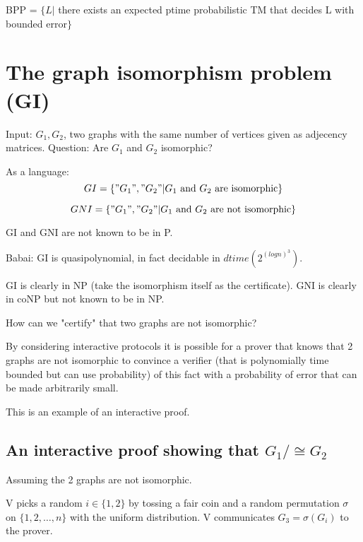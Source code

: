 \documentclass[a4paper,12pt]{article}
\theoremstyle{definition}
\theoremstyle{remark}
\begin{document}
BPP = $\{L | $ there exists an expected ptime probabilistic TM that decides L with bounded error$\}$







\newpage

\section{The graph isomorphism problem (GI)}

Input: $G_1, G_2$, two graphs with the same number of vertices given as adjecency matrices.
Question: Are $G_1$ and $G_2$ isomorphic?

As a language:
\begin{equation*}
    GI = \{"G_1", "G_2" | G_1 \text{ and } G_2 \text{ are isomorphic}\}
\end{equation*}

\begin{equation*}
    GNI = \{"G_1", "G_2" | G_1 \text{ and } G_2 \text{ are not isomorphic}\}
\end{equation*}

GI and GNI are not known to be in P.

Babai: GI is quasipolynomial, in fact decidable in $dtime(2^{(log n)^3})$.

GI is clearly in NP (take the isomorphism itself as the certificate).
GNI is clearly in coNP but not known to be in NP.

How can we "certify" that two graphs are not isomorphic?

By considering interactive protocols it is possible for a prover that knows that 2 graphs are not isomorphic to convince a verifier
(that is polynomially time bounded but can use probability) of this fact with a probability of error that can be made arbitrarily small.

This is an example of an interactive proof.

\subsection*{An interactive proof showing that $G_1 /\cong G_2$}
Assuming the 2 graphs are not isomorphic.

V picks a random $i \in \{1, 2\}$ by tossing a fair coin and a random permutation $\sigma$ on $\{1, 2, \dots, n\}$ with the uniform distribution.
V communicates $G_3 = \sigma (G_i)$ to the prover.
\end{document}
